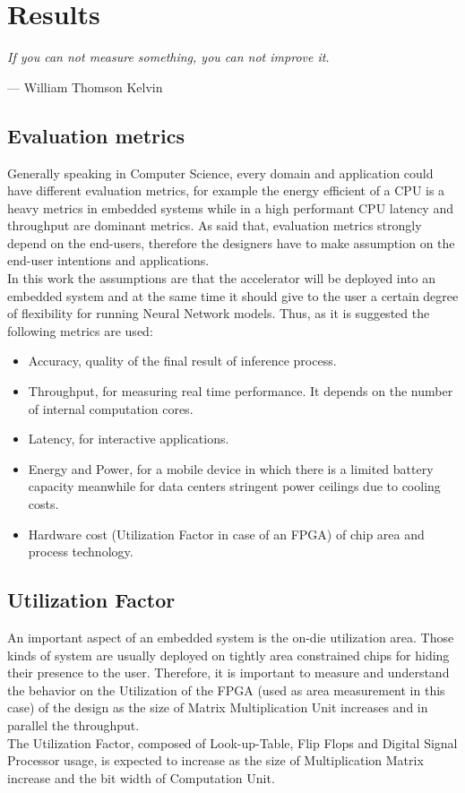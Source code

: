 \chapter{Results}

\epigraph{ \textit{If you can not measure something, you can not improve it.}}{--- \textup{William Thomson Kelvin}}

\section{Evaluation metrics}
Generally speaking in Computer Science, every domain and application could have different evaluation metrics, for example the energy efficient of a CPU is a heavy metrics in embedded systems while in a high performant CPU latency and throughput are dominant metrics. As said that, evaluation metrics strongly depend on the end-users, therefore the designers have to make assumption on the end-user intentions and applications.\\
In this work the assumptions are that the accelerator will be deployed into an embedded system and at the same time it should give to the user a certain degree of flexibility for running Neural Network models. Thus, as it is suggested \cite{paper:1} the following metrics are used:
\begin{itemize}
\item Accuracy, quality of the final result of inference process.
\item Throughput, for measuring real time performance. It depends on the number of internal computation cores.
\item Latency, for interactive applications.
\item Energy and Power, for a mobile device in which there is a limited battery capacity meanwhile for data centers stringent power ceilings due to cooling costs.
\item Hardware cost (Utilization Factor in case of an FPGA) of chip area and process technology.
\end{itemize}
\newpage
\section{Utilization Factor}
An important aspect of an embedded system is the on-die utilization area. Those kinds of system are usually deployed on tightly area constrained chips for hiding their presence to the user.
Therefore, it is important to measure and understand the behavior on the Utilization of the FPGA (used as area measurement in this case) of the design as the size of Matrix Multiplication Unit increases and in parallel the throughput.\\
The Utilization Factor, composed of Look-up-Table, Flip Flops and Digital Signal Processor usage, is expected to increase as the size of Multiplication Matrix increase and the bit width of Computation Unit.


